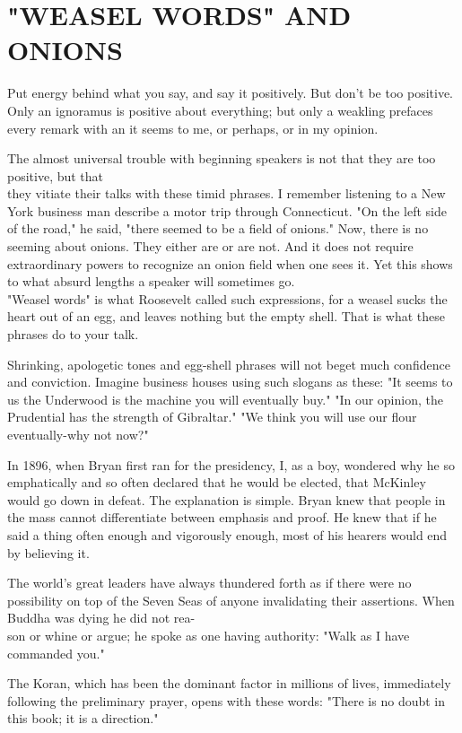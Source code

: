 \documentclass[10pt]{article}
\begin{document}
\section*{"WEASEL WORDS" AND ONIONS}
Put energy behind what you say, and say it positively. But don't be too positive. Only an ignoramus is positive about everything; but only a weakling prefaces every remark with an it seems to me, or perhaps, or in my opinion.

The almost universal trouble with beginning speakers is not that they are too positive, but that\\
they vitiate their talks with these timid phrases. I remember listening to a New York business man describe a motor trip through Connecticut. "On the left side of the road," he said, "there seemed to be a field of onions." Now, there is no seeming about onions. They either are or are not. And it does not require extraordinary powers to recognize an onion field when one sees it. Yet this shows to what absurd lengths a speaker will sometimes go.\\
"Weasel words" is what Roosevelt called such expressions, for a weasel sucks the heart out of an egg, and leaves nothing but the empty shell. That is what these phrases do to your talk.

Shrinking, apologetic tones and egg-shell phrases will not beget much confidence and conviction. Imagine business houses using such slogans as these: "It seems to us the Underwood is the machine you will eventually buy." "In our opinion, the Prudential has the strength of Gibraltar." "We think you will use our flour eventually-why not now?"

In 1896, when Bryan first ran for the presidency, I, as a boy, wondered why he so emphatically and so often declared that he would be elected, that McKinley would go down in defeat. The explanation is simple. Bryan knew that people in the mass cannot differentiate between emphasis and proof. He knew that if he said a thing often enough and vigorously enough, most of his hearers would end by believing it.

The world's great leaders have always thundered forth as if there were no possibility on top of the Seven Seas of anyone invalidating their assertions. When Buddha was dying he did not rea-\\
son or whine or argue; he spoke as one having authority: "Walk as I have commanded you."

The Koran, which has been the dominant factor in millions of lives, immediately following the preliminary prayer, opens with these words: "There is no doubt in this book; it is a direction."
\end{document}
